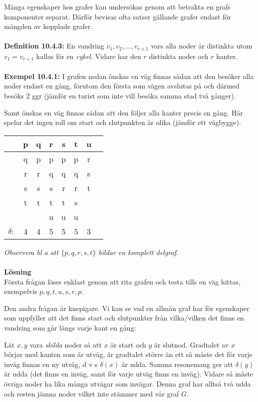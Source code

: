 \documentclass{article}
\begin{document}
Många egenskaper hos grafer kan undersökas genom att betrakta en grafs komponenter separat. Därför bevisas ofta satser gällande grafer endast för mängden av kopplade grafer.\\ \\
\textbf{Definition 10.4.3:} En vandring $v_1,v_2,...,v_{r+1}$ vars alla noder är distinkta utom $v_1=v_{r+1}$ kallas för en \textit{cykel}. Vidare har den $r$ distinkta noder och $r$ kanter.\\ \\
\textbf{Exempel 10.4.1:} I grafen nedan önskas en väg finnas sådan att den besöker alla noder endast en gång, förutom den första som vägen avslutas på och därmed besöks 2 ggr (jämför en turist som inte vill besöka samma stad två gånger).

Samt önskas en väg finnas sådan att den följer alla kanter precis en gång. Här spelar det ingen roll om start och slutpunkten är olika (jämför ett vägbygge).
\begin{center}
\begin{tabular}{l*{6}{c}r}
 & p & q & r & s & t & u\\
\hline
 & q & p & p & p & p & r\\
 & r & r & q & q & q & s\\
 & s & s & s & r & r & t\\
 & t & t & t & t & s \\
 &  &   & u & u & u\\
\hline
$\delta:$ & 4 & 4 & 5 & 5 & 5 & 3
\end{tabular}
\end{center}
\textit{Observera bl a att $\{p,q,r,s,t\}$ bildar en komplett delgraf}.\\ \\ 
\textbf{Lösning}\\ 
Första frågan löses enklast genom att rita grafen och testa tills en väg hittas, exempelvis $p,q,t,u,s,r,p$.

Den andra frågan är knepigare. Vi kan se vad en allmän graf har för egenskaper som uppfyller att det finns start och slutpunkter från vilka/vilken det finns en vandring som går längs varje kant en gång: 

Låt $x,y$ vara \textit{skilda} noder så att $x$ är start och $y$ är slutnod. Gradtalet av $x$ börjar med kanten som är utväg, är gradtalet större än ett så måste det för varje inväg finnas en ny utväg, d v s $\delta(x)$ är udda. Samma resonemang ger att $\delta(y)$ är udda (det finns en inväg, samt för varje utväg finns en inväg). Vidare så måste övriga noder ha lika många utvägar som invägar. Denna graf har alltså två udda och resten jämna noder vilket inte stämmer med vår graf $G$. 
\end{document}
